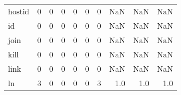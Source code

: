 \begin{tabular}{lrrrrrrrrr}
hostid    &                                       0 &                                                  0 &                                                  0 &                                                  0 &                                                  0 &                                                  0 &                                                NaN &                                    NaN &                                  NaN \\
id        &                                       0 &                                                  0 &                                                  0 &                                                  0 &                                                  0 &                                                  0 &                                                NaN &                                    NaN &                                  NaN \\
join      &                                       0 &                                                  0 &                                                  0 &                                                  0 &                                                  0 &                                                  0 &                                                NaN &                                    NaN &                                  NaN \\
kill      &                                       0 &                                                  0 &                                                  0 &                                                  0 &                                                  0 &                                                  0 &                                                NaN &                                    NaN &                                  NaN \\
link      &                                       0 &                                                  0 &                                                  0 &                                                  0 &                                                  0 &                                                  0 &                                                NaN &                                    NaN &                                  NaN \\
ln        &                                       3 &                                                  0 &                                                  0 &                                                  0 &                                                  0 &                                                  3 &                                                1.0 &                                    1.0 &                                  1.0 \\

\end{tabular}
